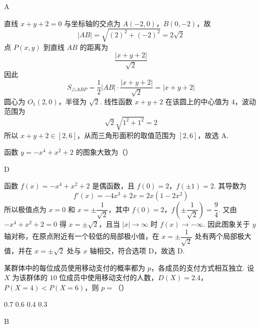 \begin{answer}
A
\end{answer}

\begin{solution}
直线 \(x+y+2=0\) 与坐标轴的交点为 \(A(-2,0)\)，\(B(0,-2)\)，故
\[
|AB|=\sqrt{(2)^2+(-2)^2}=2\sqrt2
\]
点 \(P(x,y)\) 到直线 \(AB\) 的距离为
\[
\dfrac{|x+y+2|}{\sqrt2}
\]
因此
\[
S_{\triangle ABP}=\dfrac12|AB|\cdot\dfrac{|x+y+2|}{\sqrt2}=|x+y+2|
\]
圆心为 \(O_1(2,0)\)，半径为 \(\sqrt2\). 线性函数 \(x+y+2\) 在该圆上的中心值为 \(4\)，波动范围为
\[
\sqrt2\sqrt{1^2+1^2}=2
\]
所以 \(x+y+2\in[2,6]\)，从而三角形面积的取值范围为 \([2,6]\)，故选 A.
\end{solution}

\begin{problem}
函数 \(y=-x^4+x^2+2\) 的图象大致为（\quad）

    {}
    {}
    {}
\end{problem}

\begin{answer}
D
\end{answer}

\begin{solution}
函数 \(f(x)=-x^4+x^2+2\) 是偶函数，且 \(f(0)=2\)，\(f(\pm1)=2\). 其导数为
\[
f'(x)=-4x^3+2x=2x(1-2x^2)
\]
所以极值点为 \(x=0\) 和 \(x=\pm\dfrac1{\sqrt2}\)，其中
\(f(0)=2\)，\(f\left(\pm\dfrac1{\sqrt2}\right)=\dfrac94\).
又由 \(-x^4+x^2+2=0\) 得 \(x=\pm\sqrt2\)，且当 \(|x|\to\infty\) 时 \(f(x)\to-\infty\). 因此图象关于 \(y\) 轴对称，在原点附近有一个较低的局部极小值，在 \(x=\pm\dfrac1{\sqrt2}\) 处有两个局部极大值，并在 \(x=\pm\sqrt2\) 处与 \(x\) 轴相交，符合选项 D，故选 D.
\end{solution}

\begin{problem}
某群体中的每位成员使用移动支付的概率都为 \(p\)，各成员的支付方式相互独立. 设 \(X\) 为该群体的 \(10\) 位成员中使用移动支付的人数，\(D(X)=2.4\)，\(P(X=4)<P(X=6)\)，则 \(p=\)（\quad）

\choices
    {\(0.7\)}
    {\(0.6\)}
    {\(0.4\)}
    {\(0.3\)}
\end{problem}

\begin{answer}
B
\end{answer}

